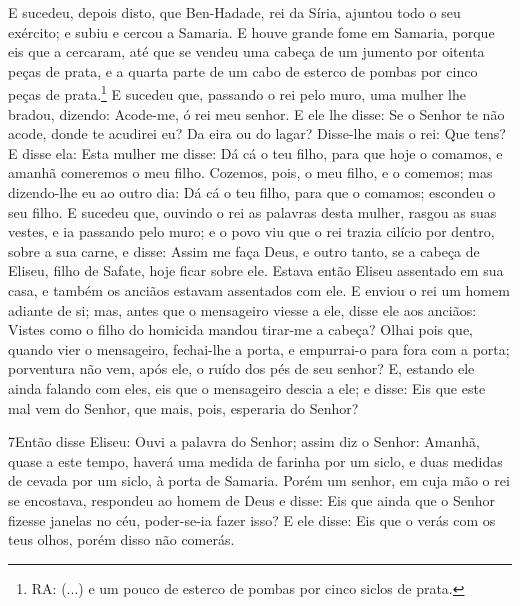 E sucedeu, depois disto, que Ben-Hadade, rei da Síria, ajuntou
todo o seu exército; e subiu e cercou a Samaria. E houve
grande fome em Samaria, porque eis que a cercaram, até que se vendeu
uma cabeça de um jumento por oitenta peças de prata, e a quarta
parte de um cabo de esterco de pombas por cinco peças de
prata.\footnote{RA: (...) e um pouco de esterco de pombas por cinco
siclos de prata.} E sucedeu que, passando o rei pelo muro,
uma mulher lhe bradou, dizendo: Acode-me, ó rei meu senhor. E
ele lhe disse: Se o Senhor te não acode, donde te acudirei eu? Da
eira ou do lagar? Disse-lhe mais o rei: Que tens? E disse
ela: Esta mulher me disse: Dá cá o teu filho, para que hoje o
comamos, e amanhã comeremos o meu filho. Cozemos, pois, o meu
filho, e o comemos; mas dizendo-lhe eu ao outro dia: Dá cá o teu
filho, para que o comamos; escondeu o seu filho. E sucedeu
que, ouvindo o rei as palavras desta mulher, rasgou as suas vestes,
e ia passando pelo muro; e o povo viu que o rei trazia cilício por
dentro, sobre a sua carne, e disse: Assim me faça Deus, e
outro tanto, se a cabeça de Eliseu, filho de Safate, hoje ficar
sobre ele. Estava então Eliseu assentado em sua casa, e
também os anciãos estavam assentados com ele. E enviou o rei um
homem adiante de si; mas, antes que o mensageiro viesse a ele, disse
ele aos anciãos: Vistes como o filho do homicida mandou tirar-me a
cabeça? Olhai pois que, quando vier o mensageiro, fechai-lhe a
porta, e empurrai-o para fora com a porta; porventura não vem, após
ele, o ruído dos pés de seu senhor? E, estando ele ainda
falando com eles, eis que o mensageiro descia a ele; e disse: Eis
que este mal vem do Senhor, que mais, pois, esperaria do Senhor?

\medskip

\lettrine{7} Então disse Eliseu: Ouvi a palavra do Senhor;
assim diz o Senhor: Amanhã, quase a este tempo, haverá uma medida de
farinha por um siclo, e duas medidas de cevada por um siclo, à porta
de Samaria. Porém um senhor, em cuja mão o rei se encostava,
respondeu ao homem de Deus e disse: Eis que ainda que o Senhor
fizesse janelas no céu, poder-se-ia fazer isso? E ele disse: Eis que
o verás com os teus olhos, porém disso não comerás.

